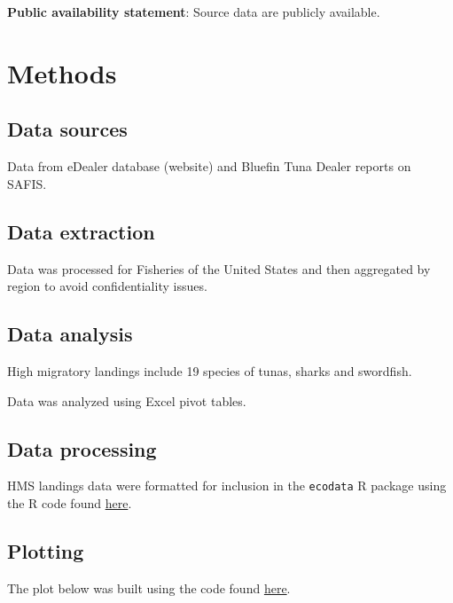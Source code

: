 \documentclass[
]{book}
\begin{document}
\textbf{Public availability statement}: Source data are publicly available.

\hypertarget{methods-17}{%
\section{Methods}\label{methods-17}}

\hypertarget{data-sources-17}{%
\subsection{Data sources}\label{data-sources-17}}

Data from eDealer database (website) and Bluefin Tuna Dealer reports on SAFIS.

\hypertarget{data-extraction-15}{%
\subsection{Data extraction}\label{data-extraction-15}}

Data was processed for Fisheries of the United States and then aggregated by region to avoid confidentiality issues.

\hypertarget{data-analysis-16}{%
\subsection{Data analysis}\label{data-analysis-16}}

High migratory landings include 19 species of tunas, sharks and swordfish.

Data was analyzed using Excel pivot tables.

\hypertarget{data-processing-12}{%
\subsection{Data processing}\label{data-processing-12}}

HMS landings data were formatted for inclusion in the \texttt{ecodata} R package using the R code found \href{https://github.com/NOAA-EDAB/ecodata/blob/master/data-raw/get_hms_landings_rev.R}{here}.

\hypertarget{plotting-11}{%
\subsection{Plotting}\label{plotting-11}}

The plot below was built using the code found
\href{https://github.com/NOAA-EDAB/ecodata/blob/master/chunk-scripts/human_dimensions.Rmd-comm_landings.R}{here}.
\end{document}
